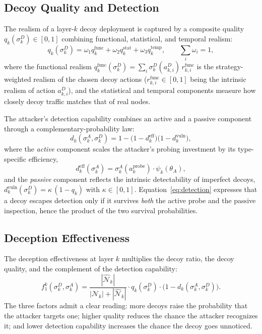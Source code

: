 \documentclass[conference]{IEEEtran}
\begin{document}
\subsection{Decoy Quality and Detection}

The realism of a layer-$k$ decoy deployment is captured by a composite quality
$q_k(\sigma_k^D)\in[0,1]$ combining functional, statistical, and temporal
realism:
\begin{equation}
q_k(\sigma_k^D) = \omega_1 q_k^{\mathrm{func}} + \omega_2 q_k^{\mathrm{stat}}
+ \omega_3 q_k^{\mathrm{temp}},
\qquad \textstyle\sum_i \omega_i = 1,
\label{eq:quality}
\end{equation}
where the functional realism $q_k^{\mathrm{func}}(\sigma_k^D)=\sum_i
\sigma_k^D(a_{k,i}^D)\,r_{k,i}^{\mathrm{func}}$ is the strategy-weighted
realism of the chosen decoy actions ($r_{k,i}^{\mathrm{func}}\in[0,1]$ being the
intrinsic realism of action $a_{k,i}^D$), and the statistical and temporal
components measure how closely decoy traffic matches that of real nodes.

The attacker's detection capability combines an active and a passive component
through a complementary-probability law:
\begin{equation}
d_k(\sigma_k^A,\sigma_k^D) =
1 - \bigl(1-d_k^{\mathrm{eff}}\bigr)\bigl(1-d_k^{\mathrm{vuln}}\bigr),
\label{eq:detection}
\end{equation}
where the \emph{active} component scales the attacker's probing investment by
its type-specific efficiency,
\begin{equation}
d_k^{\mathrm{eff}}(\sigma_k^A) = \sigma_k^A(a_k^{\mathrm{probe}})
\cdot \psi_k(\theta_A),
\end{equation}
and the \emph{passive} component reflects the intrinsic detectability of
imperfect decoys, $d_k^{\mathrm{vuln}}(\sigma_k^D) = \kappa\,(1-q_k)$ with
$\kappa\in[0,1]$. Equation~\eqref{eq:detection} expresses that a decoy escapes
detection only if it survives \emph{both} the active probe and the passive
inspection, hence the product of the two survival probabilities.

\subsection{Deception Effectiveness}

The deception effectiveness at layer $k$ multiplies the decoy ratio, the decoy
quality, and the complement of the detection capability:
\begin{equation}
f_1^k(\sigma_k^D,\sigma_k^A) =
\frac{|\hat{\mathcal{N}}_k|}{|\mathcal{N}_k|+|\hat{\mathcal{N}}_k|}
\cdot q_k(\sigma_k^D)\cdot\bigl(1-d_k(\sigma_k^A,\sigma_k^D)\bigr).
\label{eq:f1}
\end{equation}
The three factors admit a clear reading: more decoys raise the probability that
the attacker targets one; higher quality reduces the chance the attacker
recognizes it; and lower detection capability increases the chance the decoy
goes unnoticed.
\end{document}
